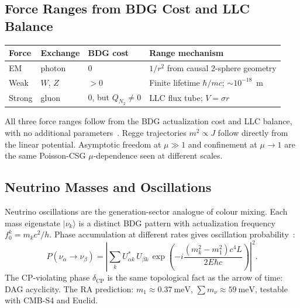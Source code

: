 \documentclass[11pt,a4paper]{article}
\begin{document}
\subsection{Force Ranges from BDG Cost and LLC Balance}

\begin{center}
\renewcommand{\arraystretch}{1.25}
\begin{tabular}{llll}
\toprule
Force & Exchange & BDG cost & Range mechanism \\
\midrule
EM & photon & 0 &
  $1/r^2$ from causal 2-sphere geometry \\
Weak & $W$, $Z$ & $>0$ &
  Finite lifetime $\hbar/mc$; $\sim 10^{-18}$~m \\
Strong & gluon & 0, but $Q_{N_2}\neq 0$ &
  LLC flux tube; $V = \sigma r$ \\
\bottomrule
\end{tabular}
\end{center}

\noindent
All three force ranges follow from the BDG actualization cost and LLC
balance, with no additional parameters~\citep{Sandeman2026RASM}. Regge
trajectories $m^2 \propto J$ follow directly from the linear potential.
Asymptotic freedom at $\mu \gg 1$ and confinement at $\mu \to 1$ are
the same Poisson-CSG $\mu$-dependence seen at different scales.

\subsection{Neutrino Masses and Oscillations}

Neutrino oscillations are the generation-sector analogue of colour mixing.
Each mass eigenstate $|\nu_k\rangle$ is a distinct BDG pattern with
actualization frequency $f_0^k = m_k c^2/h$. Phase accumulation at
different rates gives oscillation probability~\citep{Sandeman2026RASM}:
\begin{equation}
  P(\nu_\alpha \to \nu_\beta) = \left|\sum_k U^*_{\alpha k}\,U_{\beta k}
  \,\exp\!\left(-i\frac{(m_k^2 - m_1^2)c^4 L}{2E\hbar c}\right)\right|^2.
  \label{eq:osc}
\end{equation}
The CP-violating phase $\delta_{\mathrm{CP}}$ is the same topological fact
as the arrow of time: DAG acyclicity. The RA prediction:
$m_1 \approx 0.37~\mathrm{meV}$, $\sum m_\nu \approx 59~\mathrm{meV}$,
testable with CMB-S4 and Euclid.
\end{document}

